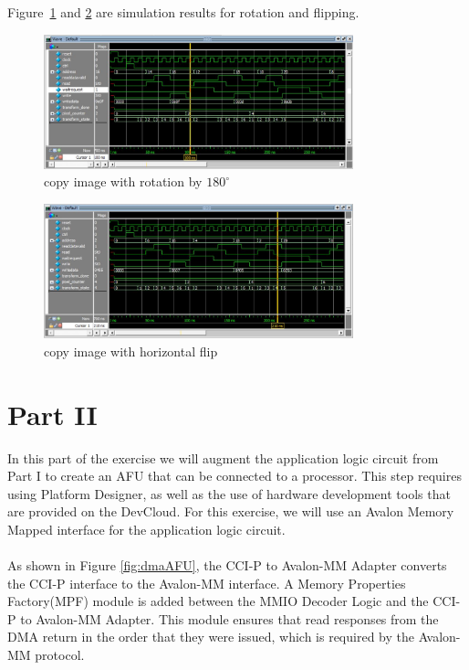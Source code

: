 \documentclass[epsfig,10pt,fullpage]{article}
\begin{document}
\begin{enumerate}
    Figure~\ref{fig:sim1} and \ref{fig:sim2} are simulation results for rotation and flipping.
        \begin{figure}[h]
        \centering
        \includegraphics[width=0.8\textwidth]{figures/sim1.JPG}
        \caption{copy image with rotation by $180^\circ$}
        \label{fig:sim1}
    \end{figure}
    
        \begin{figure}[h]
        \centering
        \includegraphics[width=0.8\textwidth]{figures/sim2.JPG}
        \caption{copy image with horizontal flip}
        \label{fig:sim2}
    \end{figure}
\end{enumerate}


\newpage
\section*{Part II}
In this part of the exercise we will augment the application logic circuit from Part I to create an AFU that can be connected to a processor. This step requires using Platform Designer, as well as the use of hardware development tools that are provided on the DevCloud. For this exercise, we will use an Avalon Memory Mapped interface for the application logic circuit. \\
\\
As shown in Figure \ref{fig:dmaAFU}, the CCI-P to Avalon-MM Adapter converts the CCI-P interface to the Avalon-MM interface. A Memory Properties Factory(MPF) module is added between the MMIO Decoder Logic and the CCI-P to Avalon-MM Adapter. This module ensures that read responses from the DMA return in the order that they were issued, which is required by the Avalon-MM protocol.\\
\end{document}

